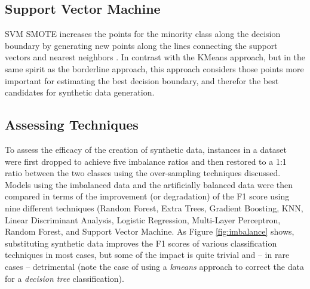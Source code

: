 \documentclass[letterpaper]{article}
\begin{document}
%
%
\subsection{Support Vector Machine}
SVM SMOTE increases the points for the minority class along the decision boundary by generating new points along the lines connecting the support vectors and nearest neighbors \parencite{Nguyen2011-cb}. In contrast with the KMeans approach, but in the same spirit as the borderline approach, this approach considers those points more important for estimating the best decision boundary, and therefor the best candidates for synthetic data generation.

\subsection{Assessing Techniques}
To assess the efficacy of the creation of synthetic data, instances in a dataset were first dropped to achieve five imbalance ratios and then restored to a 1:1 ratio between the two classes using the over-sampling techniques discussed. Models using the imbalanced data and the artificially balanced data were then compared in terms of the improvement (or degradation) of the F1 score using nine different techniques (Random Forest, Extra Trees, Gradient Boosting, KNN, Linear Discriminant Analysis, Logistic Regression, Multi-Layer Perceptron, Random Forest, and Support Vector Machine. As Figure \ref{fig:imbalance} shows, substituting synthetic data improves the F1 scores of various classification techniques in most cases, but some of the impact is quite trivial and -- in rare cases -- detrimental (note the case of using a \textit{kmeans} approach to correct the data for a \textit{decision tree} classification). 
\end{document}
